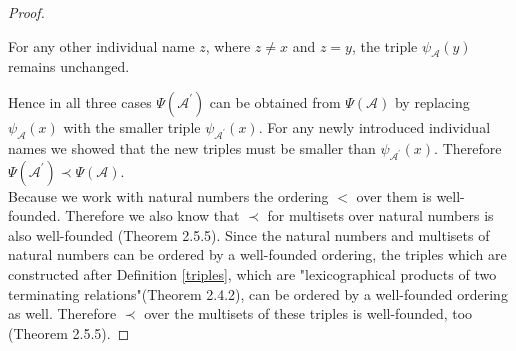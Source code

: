 \documentclass{book}
\theoremstyle{break}
\theoremstyle{definition}
\begin{document}
\begin{proof}
\begin{itemize}
For any other individual name $z$, where $z\neq x$ and $z=y$, the triple $\psi_\mathcal{A}(y)$ remains unchanged.
\end{itemize}
Hence in all three cases $\Psi(\mathcal{A}^\prime)$ can be obtained from $\Psi(\mathcal{A})$ by replacing $\psi_\mathcal{A}(x)$ with the smaller triple $\psi_{\mathcal{A}^\prime}(x)$. For any newly introduced individual names we showed that the new triples must be smaller than $\psi_{\mathcal{A}^\prime}(x)$. Therefore $\Psi(\mathcal{A}^\prime)\prec\Psi(\mathcal{A})$.\\
Because we work with natural numbers the ordering $<$ over them is well-founded. Therefore we also know that $\prec$ for multisets over natural numbers is also well-founded \cite{bn}(Theorem 2.5.5). Since the natural numbers and multisets of natural numbers can be ordered by a well-founded ordering, the triples which are constructed after Definition \ref{triples}, which are "lexicographical products of two terminating relations"\cite{bn}(Theorem 2.4.2), can be ordered by a well-founded ordering as well. Therefore $\prec$ over the multisets of these triples is well-founded, too \cite{bn}(Theorem 2.5.5).  
\end{proof}
\end{document}
